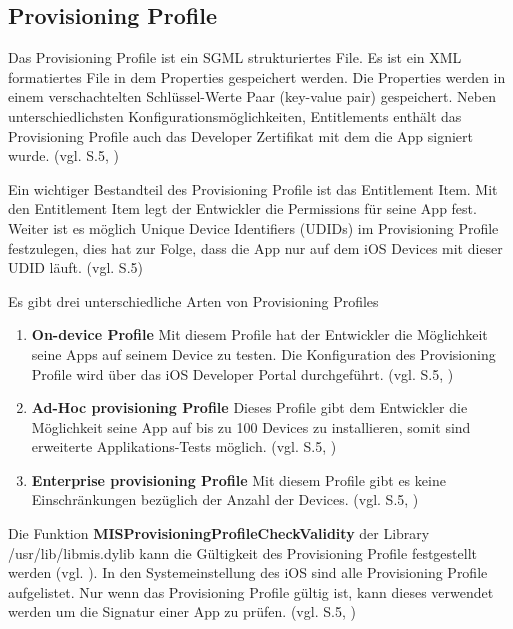 \subsection{Provisioning Profile}
\label{sec:ProvisioningProfile}
Das Provisioning Profile ist ein SGML strukturiertes File. Es ist ein XML formatiertes File in dem Properties gespeichert werden. Die Properties werden in einem verschachtelten Schlüssel-Werte Paar (key-value pair) gespeichert. Neben unterschiedlichsten Konfigurationsmöglichkeiten, Entitlements enthält das Provisioning Profile auch das Developer Zertifikat mit dem die App signiert wurde. (vgl. \cite{iOSSec[5]} S.5, \cite{Hacking[1], ProvisioningProfile[1], ProvisioningProfile[2]}) \par
Ein wichtiger Bestandteil des Provisioning Profile ist das Entitlement Item. Mit den Entitlement Item legt der Entwickler die \glqq Permissions\glqq{} für seine App fest. Weiter ist es möglich Unique Device Identifiers (UDIDs) im Provisioning Profile festzulegen, dies hat zur Folge, dass die App nur auf dem iOS Devices mit dieser UDID läuft. (vgl. \cite{iOSSec[5]} S.5) \par 
Es gibt drei unterschiedliche Arten von Provisioning Profiles 
\begin{enumerate}
    \item \textbf{On-device Profile} \newline
Mit diesem Profile hat der Entwickler die Möglichkeit seine Apps auf seinem Device zu testen. Die Konfiguration des Provisioning Profile wird über das iOS Developer Portal durchgeführt. (vgl. \cite{iOSSec[5]} S.5, \cite{AppDist[1]})
    
    \item \textbf{Ad-Hoc provisioning Profile} \newline
Dieses Profile gibt dem Entwickler die Möglichkeit seine App auf bis zu 100 Devices zu installieren, somit sind erweiterte Applikations-Tests möglich. (vgl. \cite{iOSSec[5]} S.5, \cite{AppDist[1]})
    
    \item \textbf{Enterprise provisioning Profile} \newline
Mit diesem Profile gibt es keine Einschränkungen bezüglich der Anzahl der Devices. (vgl. \cite{iOSSec[5]} S.5, \cite{AppDist[1]})
\end{enumerate}

Die Funktion \textbf{MISProvisioningProfileCheckValidity} der Library \glqq /usr/lib/libmis.dylib\grqq{} kann die Gültigkeit des Provisioning Profile festgestellt werden (vgl. \cite{Cache[1]}). In den Systemeinstellung des iOS sind alle Provisioning Profile aufgelistet. Nur wenn das Provisioning Profile gültig ist, kann dieses verwendet werden um die Signatur einer App zu prüfen. (vgl. \cite{iOSSec[5]} S.5, \cite{AppDist[1], Hacking[1]}) \par  

